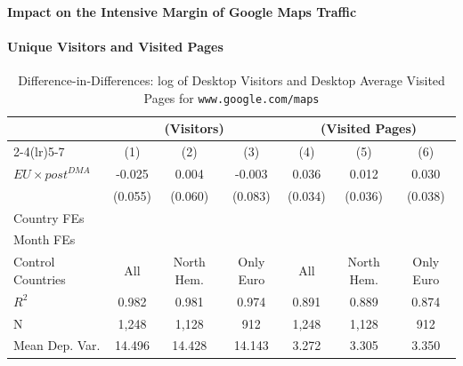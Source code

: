 \documentclass[11pt]{article}
\begin{document}
	
	
	
	
	\clearpage
	
	\paragraph{Impact on the Intensive Margin of Google Maps Traffic} 
	
	\paragraph{Unique Visitors and Visited Pages} 
	
	\clearpage
	
	\begin{table}
		\centering
		\def\sym#1{\ifmmode^{#1}\else\(^{#1}\)\fi}
		\caption{\label{tab:did_visitor_pages} Difference-in-Differences: log of Desktop Visitors and Desktop Average Visited Pages for \texttt{www.google.com/maps}}
		\begin{threeparttable}
			\begin{tabular}{lcccccc}
				\hline \noalign{\smallskip} 
				& \multicolumn{3}{c}{(Visitors)} & \multicolumn{3}{c}{(Visited Pages)}  \\ \cmidrule(lr){2-4}\cmidrule(lr){5-7}
				
				&         (1)   &         (2)   &         (3)   &         (4)   &         (5)   &         (6)   \\
				\midrule
				$ EU \times post^{DMA} $ &      -0.025   &       0.004   &      -0.003   &       0.036   &       0.012   &       0.030   \\
				&     (0.055)   &     (0.060)   &     (0.083)   &     (0.034)   &     (0.036)   &     (0.038)   \\
				
				Country FEs         &  \checkmark   &  \checkmark   &  \checkmark   &  \checkmark   &  \checkmark   &  \checkmark   \\
				Month FEs           &  \checkmark   &  \checkmark   &  \checkmark   &  \checkmark   &  \checkmark   &  \checkmark   \\
				Control Countries   &         All   &  North Hem.   &   Only Euro   &         All   &  North Hem.   &   Only Euro   \\
				$ R ^2 $            &       0.982   &       0.981   &       0.974   &       0.891   &       0.889   &       0.874   \\
				N                   &       1,248   &       1,128   &         912   &       1,248   &       1,128   &         912   \\
				Mean Dep. Var.      &      14.496   &      14.428   &      14.143   &       3.272   &       3.305   &       3.350   \\
				\midrule
			\end{tabular}
			

\end{threeparttable}
\end{table}
\end{document}

